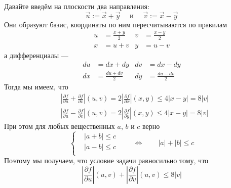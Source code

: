 \documentclass[12pt,a4paper]{article}
\DeclareMathOperator{\grad}{grad}
\begin{document}
\begin{enumproblem}

    \end{enumproblem}

    \begin{enumproblem}
        Давайте введём на плоскости два направления:
        \[\overrightarrow{u} := \overrightarrow{x} + \overrightarrow{y} \quad \text{ и } \quad \overrightarrow{v} := \overrightarrow{x} - \overrightarrow{y}\]
        Они образуют базис, координаты по ним пересчитываются по правилам
        \begin{align*}
            u &= \frac{x + y}{2}&
            v &= \frac{x - y}{2}\\
            x &= u + v&
            y &= u - v
        \end{align*}
        а дифференциалы ---
        \begin{align*}
            du &= dx + dy&
            dv &= dx - dy\\
            dx &= \frac{du + dv}{2}&
            dy &= \frac{du - dv}{2}
        \end{align*}
        Тогда мы имеем, что
        \begin{align*}
            &\left|\frac{\partial f}{\partial u} + \frac{\partial f}{\partial v}\right|(u, v) = 2\left|\frac{\partial f}{\partial x}\right| (x, y) \leqslant 4|x-y| = 8|v|\\
            &\left|\frac{\partial f}{\partial u} - \frac{\partial f}{\partial v}\right|(u, v) = 2\left|\frac{\partial f}{\partial y}\right| (x, y) \leqslant 4|x-y| = 8|v|
        \end{align*}
        При этом для любых вещественных $a$, $b$ и $c$ верно
        \[
            \left\{
                \begin{aligned}
                    &|a + b| \leqslant c\\
                    &|a - b| \leqslant c\\
                \end{aligned}
            \right.
            \qquad \Longleftrightarrow \qquad
            |a| + |b| \leqslant c
        \]
        Поэтому мы получаем, что условие задачи равносильно тому, что
        \[\left|\frac{\partial f}{\partial u}\right|(u, v) + \left|\frac{\partial f}{\partial v}\right|(u, v) \leqslant 8|v|\]
        

\end{enumproblem}
\end{document}
